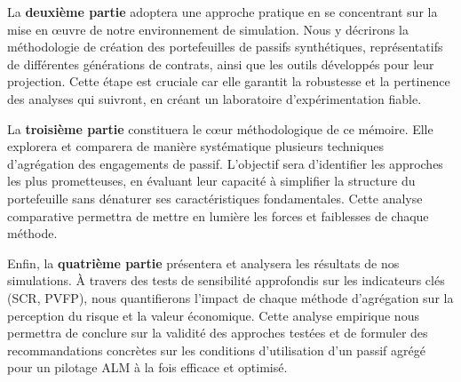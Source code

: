 La \textbf{deuxième partie} adoptera une approche pratique en se concentrant sur la mise en œuvre de notre environnement de simulation. Nous y décrirons la méthodologie de création des portefeuilles de passifs synthétiques, représentatifs de différentes générations de contrats, ainsi que les outils développés pour leur projection. Cette étape est cruciale car elle garantit la robustesse et la pertinence des analyses qui suivront, en créant un laboratoire d'expérimentation fiable.\newline{}


La \textbf{troisième partie} constituera le cœur méthodologique de ce mémoire. Elle explorera et comparera de manière systématique plusieurs techniques d'agrégation des engagements de passif. L'objectif sera d'identifier les approches les plus prometteuses, en évaluant leur capacité à simplifier la structure du portefeuille sans dénaturer ses caractéristiques fondamentales. Cette analyse comparative permettra de mettre en lumière les forces et faiblesses de chaque méthode.\newline{}


Enfin, la \textbf{quatrième partie} présentera et analysera les résultats de nos simulations. À travers des tests de sensibilité approfondis sur les indicateurs clés (SCR, PVFP), nous quantifierons l'impact de chaque méthode d'agrégation sur la perception du risque et la valeur économique. Cette analyse empirique nous permettra de conclure sur la validité des approches testées et de formuler des recommandations concrètes sur les conditions d'utilisation d'un passif agrégé pour un pilotage ALM à la fois efficace et optimisé.